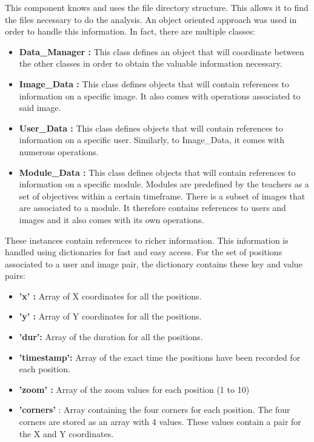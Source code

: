 \documentclass[a4paper,11pt]{report}
\numberwithin{figure}{chapter} %
\begin{document}
    This component knows and uses the file directory structure.
    This allows it to find the files necessary to do the analysis.
    An object oriented approach was used in order to handle this information.
    In fact, there are multiple classes:

    \begin{itemize}
        \item[\textbullet] \textbf{Data\_Manager :} This class defines an object that will coordinate between the other classes in order to obtain the valuable information necessary.
        \item[\textbullet] \textbf{Image\_Data :} This class defines objects that will contain references to information on a specific image.
        It also comes with operations associated to said image.
        \item[\textbullet] \textbf{User\_Data :} This class defines objects that will contain references to information on a specific user.
        Similarly, to Image\_Data, it comes with numerous operations.
        \item[\textbullet] \textbf{Module\_Data :} This class defines objects that will contain references to information on a specific module.
        Modules are predefined by the teachers as a set of objectives within a certain timeframe.
        There is a subset of images that are associated to a module.
        It therefore contains references to users and images and it also comes with its own operations.
    \end{itemize}

    These instances contain references to richer information.
    This information is handled using dictionaries for fast and easy access.
    For the set of positions associated to a user and image pair, the dictionary contains these key and value pairs:
    \begin{itemize}
        \item[\textbullet] \textbf{'x' :} Array of X coordinates for all the positions.
        \item[\textbullet] \textbf{'y' :} Array of Y coordinates for all the positions.
        \item[\textbullet] \textbf{'dur':} Array of the duration for all the positions.
        \item[\textbullet] \textbf{'timestamp':} Array of the exact time the positions have been recorded for each position.
        \item[\textbullet] \textbf{'zoom' :} Array of the zoom values for each position (1 to 10)
        \item[\textbullet] \textbf{'corners'} : Array containing the four corners for each position.
        The four corners are stored as an array with 4 values.
        These values contain a pair for the X and Y coordinates.
    \end{itemize}
\end{document}
